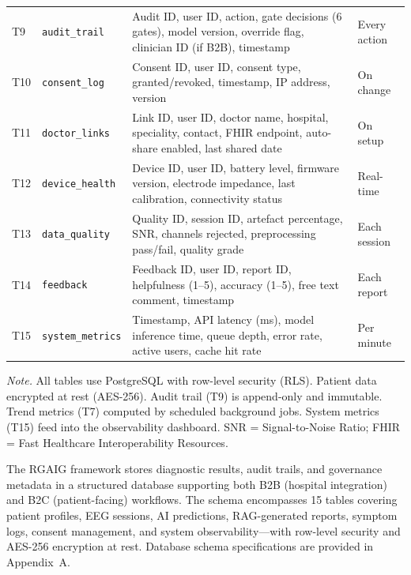 {\begin{xltabular}{\textwidth}{@{} >{\raggedright\arraybackslash}p{0.6cm} >{\raggedright\arraybackslash}p{2.8cm} L >{\raggedright\arraybackslash}p{1.5cm} @{}}
\addlinespace
T9 & \texttt{audit\_\allowbreak trail} & Audit ID, user ID, action, gate decisions (6 gates), model version, override flag, clinician ID (if B2B), timestamp & Every action \\
\addlinespace
T10 & \texttt{consent\_\allowbreak log} & Consent ID, user ID, consent type, granted/revoked, timestamp, IP address, version & On change \\
\addlinespace
T11 & \texttt{doctor\_\allowbreak links} & Link ID, user ID, doctor name, hospital, speciality, contact, FHIR endpoint, auto-share enabled, last shared date & On setup \\
\addlinespace
T12 & \texttt{device\_\allowbreak health} & Device ID, user ID, battery level, firmware version, electrode impedance, last calibration, connectivity status & Real-time \\
\addlinespace
T13 & \texttt{data\_\allowbreak quality} & Quality ID, session ID, artefact percentage, SNR, channels rejected, preprocessing pass/fail, quality grade & Each session \\
\addlinespace
T14 & \texttt{feedback} & Feedback ID, user ID, report ID, helpfulness (1--5), accuracy (1--5), free text comment, timestamp & Each report \\
\addlinespace
T15 & \texttt{system\_\allowbreak metrics} & Timestamp, API latency (ms), model inference time, queue depth, error rate, active users, cache hit rate & Per minute \\
\end{xltabular}}
\vspace{0.5em}
\noindent\textit{Note.} All tables use PostgreSQL with row-level security (RLS). Patient data encrypted at rest (AES-256). Audit trail (T9) is append-only and immutable. Trend metrics (T7) computed by scheduled background jobs. System metrics (T15) feed into the observability dashboard. SNR = Signal-to-Noise Ratio; FHIR = Fast Healthcare Interoperability Resources.
\fi %

\label{sec:backend_tables}
\label{tab:backend_db}

The RGAIG framework stores diagnostic results, audit trails, and governance metadata in a structured database supporting both B2B (hospital integration) and B2C (patient-facing) workflows. The schema encompasses 15 tables covering patient profiles, EEG sessions, AI predictions, RAG-generated reports, symptom logs, consent management, and system observability---with row-level security and AES-256 encryption at rest. Database schema specifications are provided in Appendix~A.


